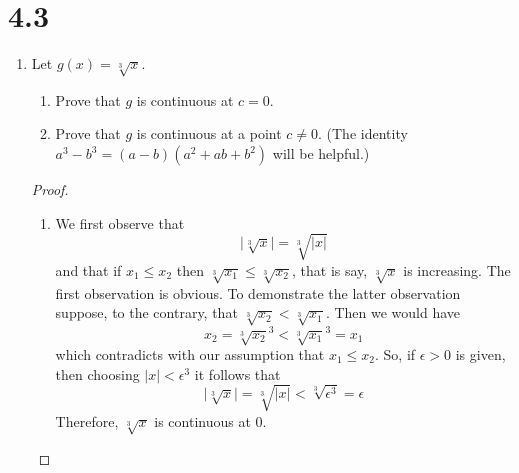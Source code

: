 \section*{4.3}
\begin{enumerate}
    \item Let \( g(x) = \sqrt[3]{x} \).
    \begin{enumerate}
        \item Prove that \( g \) is continuous at \( c = 0 \).
        \item Prove that \( g \) is continuous at a point \( c \neq 0 \). (The identity \( a^{3}-b^{3} = (a-b)(a^{2}+ab+b^{2}) \) will be helpful.)
    \end{enumerate}
    \begin{proof}
    \begin{enumerate}
        \item We first observe that
        \[
        \vert \sqrt[3]{x} \vert = \sqrt[3]{\vert x \vert}
        \]
        and that if \( x_{1} \leq x_{2} \) then \( \sqrt[3]{x_{1}} \leq \sqrt[3]{x_{2}} \), that is say, \( \sqrt[3]{x} \) is increasing. The first observation is obvious. To demonstrate the latter observation suppose, to the contrary, that \( \sqrt[3]{x_{2}} < \sqrt[3]{x_{1}} \). Then we would have
        \[
        x_{2} = \sqrt[3]{x_{2}}^{3} < \sqrt[3]{x_{1}}^{3} = x_{1}
        \]
        which contradicts with our assumption that \( x_{1} \leq x_{2} \). So, if \( \epsilon > 0 \) is given, then choosing \( \vert x \vert < \epsilon^{3} \) it follows that
        \[
        \vert \sqrt[3]{x} \vert = \sqrt[3]{\vert x \vert} < \sqrt[3]{\epsilon^{3}} = \epsilon
        \]
        Therefore, \( \sqrt[3]{x} \) is continuous at \( 0 \).
        

\end{enumerate}
\end{proof}
\end{enumerate}
